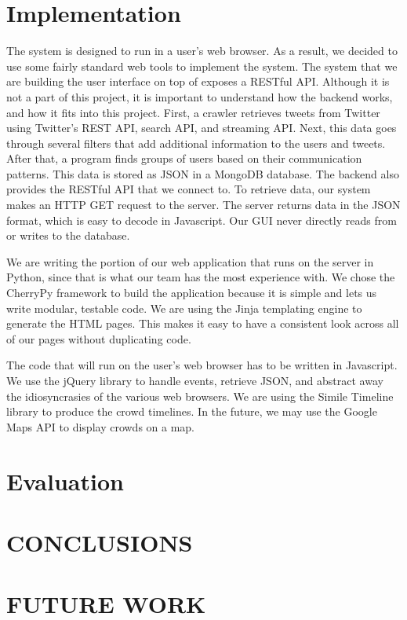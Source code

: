 \documentclass{sig-alternate}
\begin{document}
\section{Implementation}
The system is designed to run in a user's web browser.  As a result, we decided
to use some fairly standard web tools to implement the system.  The system that
we are building the user interface on top of exposes a RESTful API.  Although
it is not a part of this project, it is important to understand how the backend
works, and how it fits into this project.  First, a crawler retrieves tweets
from Twitter using Twitter's REST API, search API, and streaming API.  Next,
this data goes through several filters that add additional information to the
users and tweets.  After that, a program finds groups of users based on their
communication patterns.  This data is stored as JSON in a MongoDB database.
The backend also provides the RESTful API that we connect to.  To retrieve
data, our system makes an HTTP GET request to the server.  The server returns
data in the JSON format, which is easy to decode in Javascript.  Our GUI never
directly reads from or writes to the database.

We are writing the portion of our web application that runs on the server in
Python, since that is what our team has the most experience with.  We chose the
CherryPy framework to build the application because it is simple and lets us
write modular, testable code.  We are using the Jinja templating engine to
generate the HTML pages. This makes it easy to have a consistent look across
all of our pages without duplicating code.

The code that will run on the user's web browser has to be written in
Javascript.  We use the jQuery library to handle events, retrieve JSON, and
abstract away the idiosyncrasies of the various web browsers.  We are using the
Simile Timeline library to produce the crowd timelines.  In the future, we may
use the Google Maps API to display crowds on a map.

\section{Evaluation}

\section{CONCLUSIONS}

\section{FUTURE WORK}


 
\end{document}
